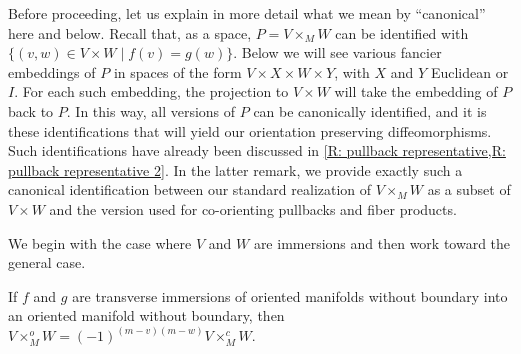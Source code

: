 Before proceeding, let us explain in more detail what we mean by ``canonical'' here and below.
Recall that, as a space, $P = V \times_M W$ can be identified with $\{(v,w) \in V \times W \mid f(v) = g(w)\}$.
Below we will see various fancier embeddings of $P$ in spaces of the form $V \times X \times W \times Y$, with $X$ and $Y$ Euclidean or $I$.
For each such embedding, the projection to $V \times W$ will take the embedding of $P$ back to $P$.
In this way, all versions of $P$ can be canonically identified, and it is these identifications that will yield our orientation preserving diffeomorphisms.
Such identifications have already been discussed in \cref{R: pullback representative,R: pullback representative 2}.
In the latter remark, we provide exactly such a canonical identification between our standard realization of $V \times_M W$ as a subset of $V \times W$ and the version used for co-orienting pullbacks and fiber products.

\begin{comment}
	is already contained in the construction of the co-oriented fiber product, where $V\times^c_MW$ can be considered to be contained in $V \times W \times \R^N$.
	Explicitly we constructed $P = (g \times \id_{\R^N})^{-1}(e(V))$, but as $e$ is an embedding, the $V$ factor of points in $P$ is implicitly determined by $(w,z) \in P \subset W \times \R^N$ as $e^{-1}((g(w),z))$.
	So $P = (g \times \id_{\R^N})^{-1}(e(V))$ is canonically identified with $\{(v,w,z) \in V \times W \times \R^N \mid e(v) = (g(w),z)\}$.
	And as $e$ is part of a Quillen co-orientation, by projecting $M \times \R^N$ to $M$, we have of course $g(w) = f(v)$, so there is a canonical map $\{(v,w,z) \in V \times W \times \R^N \mid e(v) \to \{(v,w) \in V \times W \mid f(v) = g(w)\}$ given by projection to the first two factors.
	This is a diffeomorphism, whose inverse takes $(v,w)$ to $(v,w,z)$ such that $e(v) = (g(w),z)$.

	\red{Put some of this as a remark in the section where pullback of co-orientation is defined.}
\end{comment}

\medskip

We begin with the case where $V$ and $W$ are immersions and then work toward the general case.

\begin{lemma}\label{L: compare cup and intersection for immersions}
	If $f$ and $g$ are transverse immersions of oriented manifolds without boundary into an oriented manifold without boundary, then $V \times_M ^oW = (-1)^{(m-v)(m-w)} V \times_M ^cW$.
\end{lemma}

